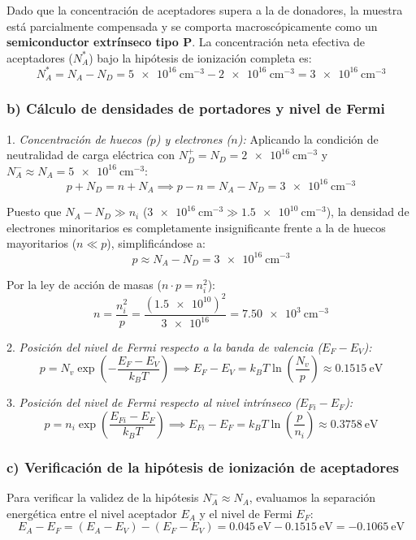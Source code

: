 \begin{problema}
Dado que la concentración de aceptadores supera a la de donadores, la muestra está parcialmente compensada y se comporta macroscópicamente como un \textbf{semiconductor extrínseco tipo P}. La concentración neta efectiva de aceptadores ($N_A^*$) bajo la hipótesis de ionización completa es:
\[
N_A^* = N_A - N_D = \SI{5e16}{\cm^{-3}} - \SI{2e16}{\cm^{-3}} = \SI{3e16}{\cm^{-3}}
\]

\subsubsection*{b) Cálculo de densidades de portadores y nivel de Fermi}

1. \textit{Concentración de huecos ($p$) y electrones ($n$):}
Aplicando la condición de neutralidad de carga eléctrica con $N_D^+ = N_D = \SI{2e16}{\cm^{-3}}$ y $N_A^- \approx N_A = \SI{5e16}{\cm^{-3}}$:
\[
p + N_D = n + N_A \implies p - n = N_A - N_D = \SI{3e16}{\cm^{-3}}
\]

Puesto que $N_A - N_D \gg n_i$ ($\SI{3e16}{\cm^{-3}} \gg \SI{1.5e10}{\cm^{-3}}$), la densidad de electrones minoritarios es completamente insignificante frente a la de huecos mayoritarios ($n \ll p$), simplificándose a:
\[
p \approx N_A - N_D = \SI{3e16}{\cm^{-3}}
\]

Por la ley de acción de masas ($n \cdot p = n_i^2$):
\[
n = \frac{n_i^2}{p} = \frac{(\num{1.5e10})^2}{\num{3e16}} = \SI{7.50e3}{\cm^{-3}}
\]

2. \textit{Posición del nivel de Fermi respecto a la banda de valencia ($E_F - E_V$):}
\[
p = N_v \exp\left( -\frac{E_F - E_V}{k_B T} \right) \implies E_F - E_V = k_B T \ln\left( \frac{N_v}{p} \right) \approx \SI{0.1515}{\eV}
\]

3. \textit{Posición del nivel de Fermi respecto al nivel intrínseco ($E_{Fi} - E_F$):}
\[
p = n_i \exp\left( \frac{E_{Fi} - E_F}{k_B T} \right) \implies E_{Fi} - E_F = k_B T \ln\left( \frac{p}{n_i} \right) \approx \SI{0.3758}{\eV}
\]

\subsubsection*{c) Verificación de la hipótesis de ionización de aceptadores}

Para verificar la validez de la hipótesis $N_A^- \approx N_A$, evaluamos la separación energética entre el nivel aceptador $E_A$ y el nivel de Fermi $E_F$:
\[
E_A - E_F = (E_A - E_V) - (E_F - E_V) = \SI{0.045}{\eV} - \SI{0.1515}{\eV} = \SI{-0.1065}{\eV}
\]


\end{problema}
